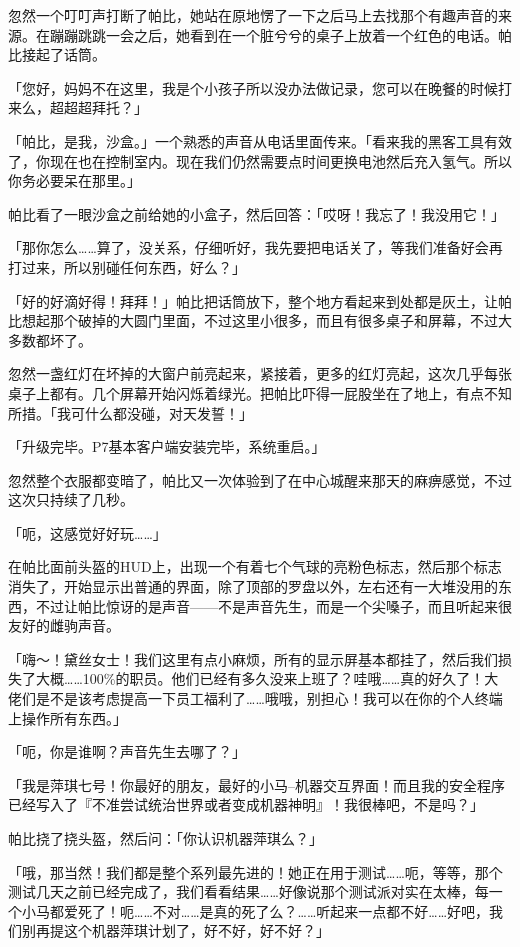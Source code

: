 忽然一个叮叮声打断了帕比，她站在原地愣了一下之后马上去找那个有趣声音的来源。在蹦蹦跳跳一会之后，她看到在一个脏兮兮的桌子上放着一个红色的电话。帕比接起了话筒。

「您好，妈妈不在这里，我是个小孩子所以没办法做记录，您可以在晚餐的时候打来么，超超超拜托？」

「帕比，是我，沙盒。」一个熟悉的声音从电话里面传来。「看来我的黑客工具有效了，你现在也在控制室内。现在我们仍然需要点时间更换电池然后充入氢气。所以你务必要呆在那里。」

帕比看了一眼沙盒之前给她的小盒子，然后回答：「哎呀！我忘了！我没用它！」

「那你怎么……算了，没关系，仔细听好，我先要把电话关了，等我们准备好会再打过来，所以别碰任何东西，好么？」

「好的好滴好得！拜拜！」帕比把话筒放下，整个地方看起来到处都是灰土，让帕比想起那个破掉的大圆门里面，不过这里小很多，而且有很多桌子和屏幕，不过大多数都坏了。

忽然一盏红灯在坏掉的大窗户前亮起来，紧接着，更多的红灯亮起，这次几乎每张桌子上都有。几个屏幕开始闪烁着绿光。把帕比吓得一屁股坐在了地上，有点不知所措。「我可什么都没碰，对天发誓！」

「{\mtzh 升级完毕。P7基本客户端安装完毕，系统重启。}」

忽然整个衣服都变暗了，帕比又一次体验到了在中心城醒来那天的麻痹感觉，不过这次只持续了几秒。

「呃，这感觉好好玩……」

在帕比面前头盔的HUD上，出现一个有着七个气球的亮粉色标志，然后那个标志消失了，开始显示出普通的界面，除了顶部的罗盘以外，左右还有一大堆没用的东西，不过让帕比惊讶的是声音——不是声音先生，而是一个尖嗓子，而且听起来很友好的雌驹声音。

「嗨～！黛丝女士！我们这里有点小麻烦，所有的显示屏基本都挂了，然后我们损失了大概……100\%的职员。他们已经有多久没来上班了？哇哦……真的好久了！大佬们是不是该考虑提高一下员工福利了……哦哦，别担心！我可以在你的个人终端上操作所有东西。」

「呃，你是谁啊？声音先生去哪了？」

「我是萍琪七号！你最好的朋友，最好的小马--机器交互界面！而且我的安全程序已经写入了『不准尝试统治世界或者变成机器神明』！我很棒吧，不是吗？」

帕比挠了挠头盔，然后问：「你认识机器萍琪么？」

「哦，那当然！我们都是整个系列最先进的！她正在用于测试……呃，等等，那个测试几天之前已经完成了，我们看看结果……好像说那个测试派对实在太棒，每一个小马都爱死了！呃……不对……是真的死了么？……听起来一点都不好……好吧，我们别再提这个机器萍琪计划了，好不好，好不好？」

